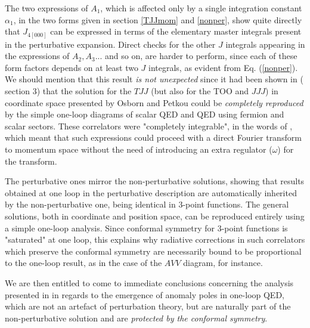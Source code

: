 \documentclass[a4paper,11pt,openright,twoside]{book}
\numberwithin{equation}{section}
\begin{document}
{{The two expressions of $A_1$,  which is affected only by a single integration constant $\alpha_1$, in the two forms given in section \ref{TJJmom} and \eqref{nonper}, show quite directly that $J_{4 [000]}$ can be expressed in terms of the elementary master integrals present in the perturbative expansion. Direct checks for the other $J$ integrals appearing in the expressions of $A_2, A_3...$ and so on, are harder to perform, since each of these form factors depends on at least two $J$ integrals, as evident from Eq. (\ref{nonper}).\\
We should mention that this result {\em is not unexpected} since it had been shown in (\cite{Coriano:2012wp} section 3) that the solution for the $TJJ$ (but also for the TOO and $JJJ$) in coordinate space presented by Osborn and Petkou \cite{Osborn:1993cr} could be {\em completely reproduced } by the simple one-loop diagrams of scalar QED and QED using fermion and scalar sectors. These correlators were "completely integrable", in the words of \cite{Coriano:2012wp}, which meant that such expressions could proceed with a direct Fourier transform to momentum space without the need of introducing an extra regulator ($\omega$) for the transform. 

The perturbative ones mirror the non-perturbative solutions, showing that results obtained at one loop in the perturbative description are automatically inherited by the non-perturbative one, being identical in 3-point functions. The general solutions, both in coordinate and position space, can be reproduced entirely using a simple one-loop analysis. Since conformal symmetry for 3-point functions is "saturated" at one loop, this explains why radiative corrections in such correlators which preserve the conformal symmetry are necessarily bound to be proportional to the one-loop result, as in the case of the $AVV$ diagram, for instance.  

We are then entitled to come to immediate conclusions concerning the analysis presented in \cite{Armillis:2009pq} in regards to the emergence of anomaly poles in one-loop QED, which are not an artefact of perturbation theory, but are naturally part of the non-perturbative solution and are {\em protected by the conformal symmetry}. 
}}
\end{document}
